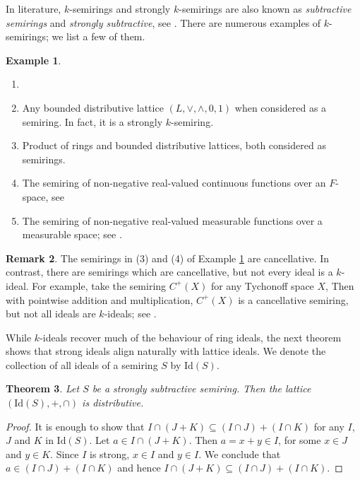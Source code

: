 \documentclass[11pt,leqno]{amsart}
\newtheorem{theorem}{Theorem}[section]
\theoremstyle{definition}
\newtheorem{example}[theorem]{Example}
\newtheorem{remark}[theorem]{Remark}
\numberwithin{equation}{section}
\begin{document}
In literature, $k$-semirings and strongly $k$-semirings are also known as \emph{subtractive semirings} and \emph{strongly subtractive}, see \cite{Katsov09, Katsov11, Il'inKatsovNam17}. There are numerous examples of $k$-semirings; we list a few of them.

\begin{example}\label{example: subtractive semirings}
\begin{enumerate}
    \item[] 
        \item Any bounded distributive lattice $(L,\vee,\wedge,0,1)$ when considered as a semiring. In fact, it is a strongly $k$-semiring.
        \item Product of rings and bounded distributive lattices, both considered as semirings.
        \item The semiring of non-negative real-valued continuous functions over an $F$-space, see \cite[Theorem 3.9]{BiswasBagSardarFilomat24}
        \item The semiring of non-negative real-valued measurable functions over a measurable space; see \cite[Corollary 3.2]{BiswasBagSardarFilomat25}.
    \end{enumerate}
\end{example}

\begin{remark}
    The semirings in (3) and (4) of Example \ref{example: subtractive semirings} are cancellative. In contrast, there are semirings which are cancellative, but not every ideal is a $k$-ideal. For example, take the semiring $C^+(X)$ for any Tychonoff space $X$, Then with pointwise addition and multiplication, $C^+(X)$ is a cancellative semiring, but not all ideals are $k$-ideals; see \cite[Example 3.1]{BiswasBagSardarFilomat24}.
\end{remark}

While $k$-ideals recover much of the behaviour of ring ideals, the next theorem shows that strong ideals align naturally with lattice ideals. We denote the collection of all ideals of a semiring $S$ by $\mathrm{Id}(S)$. 

\begin{theorem}\label{Ideal lattice of strongly subtractive is distributive}
    Let $S$ be a strongly subtractive semiring. Then the lattice $(\mathrm{Id}(S),+,\cap)$ is distributive. 
\end{theorem}

\begin{proof}
    It is enough to show that $I\cap (J+K)\subseteq (I\cap J)+(I\cap K)$ for any $I$, $J$ and $K$ in $\mathrm{Id}(S)$. Let $a\in I\cap (J+K)$. Then $a=x+y\in I$, for some $x\in J$ and $y\in K$. Since $I$ is strong, $x\in I$ and $y\in I$. We conclude that $a\in (I\cap J)+(I\cap K)$ and hence $I\cap (J+K)\subseteq (I\cap J)+(I\cap K)$.
\end{proof}
\end{document}
